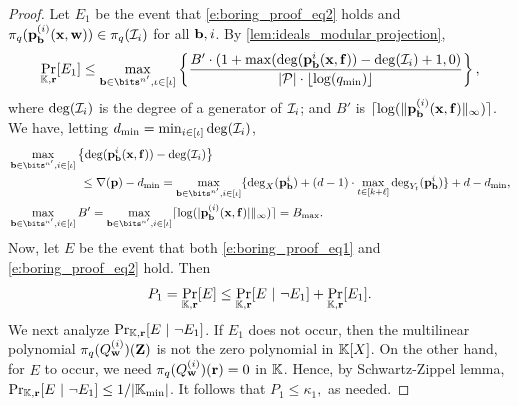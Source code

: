 \documentclass[11pt,letterpaper,usenames,dvipsnames]{article}
\begin{document}
\begin{proof}
Let $E_1$ be the event that \eqref{e:boring_proof_eq2} holds and $\pi_q(\mathbf{p}_{\mathbf{b}}^{(i)}(\mathbf{x},\mathbf{w}))\in \pi_q(\mathcal{I}_i)$ for all $\mathbf{b},i$. By \cref{lem:ideals_modular projection}, 
%
$$
\Pr_{\KK,\rr}[E_1] \leq \max_{\bb\in \bits^{n'},\iota\in[\iota]}\left\{\frac{B'\cdot (1 +\max(\deg(\pp_{\bb}^{i}(\xx,\bff))-\deg(\ideal_{i})+1,0)}{|\mathcal{P}|\cdot \lfloor\log(q_{\min})\rfloor}\right\},
$$
where $\deg(\mathcal{I}_{i})$ is the degree of a generator of $\mathcal{I}_{i}$; and $B'$ is $\lceil\log(\|\mathbf{p}_{\mathbf{b}}^{(i)} (\mathbf{x},\mathbf{f})\|_\infty)\rceil$. We have, letting $d_{\min}=\min_{i\in [\iota]} \deg(\mathcal{I}_i)$, 
%
\begin{align*}
&\max_{\bb\in \bits^{n'},i\in[\iota]}\left\{\deg(\pp_{\bb}^{i}(\xx,\bff))-\deg(\ideal_i)\right\} \\  &\qquad\qquad \qquad \leq\nabla(\pp) -d_{\min}= \max_{\bb\in \bits^{n'}, i\in[\iota]}\{\deg_X(\pp_{\bb}^i) + (\moduledegree-1)\cdot \max_{t\in [\inplen+\codedim\textit{}]}\deg_{Y_t}(\pp_{\bb}^i)\} + \moduledegree -d_{\min},\\
& \max_{\bb\in \bits^{n'}, i\in [\iota]} B' = \max_{\bb\in \bits^{n'}, i\in [\iota]} \lceil\log(|\pp_{\bb}^{(i)}(\xx,\ff)| \rVert_{\infty})\rceil = B_{\max}.
\end{align*}
%
Now, let $E$ be the event that both \eqref{e:boring_proof_eq1} and \eqref{e:boring_proof_eq2} hold. Then
%
$$
P_1=\Pr_{\mathbb{K},\mathbf{r}}[E] \leq \Pr_{\mathbb{K}, \mathbf{r}}[E \ | \ \neg E_1] + \Pr_{\mathbb{K},\mathbf{r}}[E_1].
$$
%
We next analyze $\Pr_{\mathbb{K}, \mathbf{r}}[E \ | \ \neg E_1]$. If $E_1$ does not occur, then the  multilinear polynomial $\pi_q(Q_{\mathbf{w}}^{(i)})(\mathbf{Z})$ is not the zero polynomial in $\mathbb{K}[X]$. On the other hand, for $E$ to occur, we need  $\pi_q(Q_{\mathbf{w}}^{(i)})(\mathbf{r})=0$ in $\mathbb{K}$. Hence, by Schwartz-Zippel lemma,  $\Pr_{\mathbb{K}, \mathbf{r}}[E \ | \ \neg E_1] \leq 1/|\mathbb{K}_{\min}|$. It follows that 
%
$
P_1 \leq \kappa_1,
$ as needed.


\end{proof}
\end{document}
